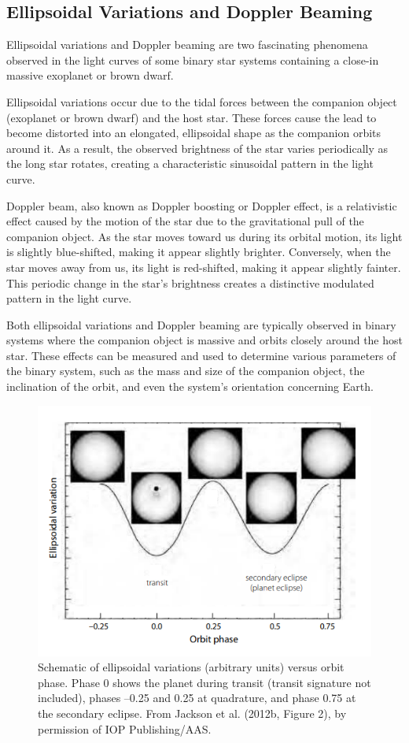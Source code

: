 \documentclass{article}
\begin{document}
\subsection{Ellipsoidal Variations and Doppler Beaming}

Ellipsoidal variations and Doppler beaming are two fascinating phenomena observed in the light curves of some binary star systems containing a close-in massive exoplanet or brown dwarf.

Ellipsoidal variations occur due to the tidal forces between the companion object (exoplanet or brown dwarf) and the host star. These forces cause the lead to become distorted into an elongated, ellipsoidal shape as the companion orbits around it. As a result, the observed brightness of the star varies periodically as the long star rotates, creating a characteristic sinusoidal pattern in the light curve.

Doppler beam, also known as Doppler boosting or Doppler effect, is a relativistic effect caused by the motion of the star due to the gravitational pull of the companion object. As the star moves toward us during its orbital motion, its light is slightly blue-shifted, making it appear slightly brighter. Conversely, when the star moves away from us, its light is red-shifted, making it appear slightly fainter. This periodic change in the star's brightness creates a distinctive modulated pattern in the light curve.

Both ellipsoidal variations and Doppler beaming are typically observed in binary systems where the companion object is massive and orbits closely around the host star. These effects can be measured and used to determine various parameters of the binary system, such as the mass and size of the companion object, the inclination of the orbit, and even the system's orientation concerning Earth.

\begin{figure}[H]
    \centering
    \includegraphics[width=0.9\linewidth]{image/orbit_ph.jpg}
    \captionsetup{font=small} 
    \caption{Schematic of ellipsoidal variations (arbitrary units) versus orbit phase. Phase 0 shows the planet during transit (transit signature not included), phases –0.25 and 0.25 at quadrature, and phase 0.75 at the secondary eclipse. From Jackson et al. (2012b, Figure 2), by permission of IOP Publishing/AAS.}
    \label{fig:ob_ph}
\end{figure}
\end{document}
